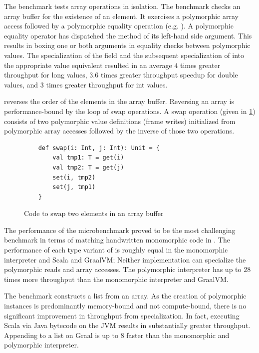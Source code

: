The  benchmark tests array operations in isolation. 
The benchmark checks an array buffer for the existence of an element.
It exercises a polymorphic array access followed by a polymorphic equality operation (e.g. ).
A polymorphic equality operator has dispatched the  method of its left-hand side argument.
This results in boxing one or both arguments in equality checks between polymorphic values.
The specialization of the  field and the subsequent specialization of  into the appropriate value equivalent resulted in an average $4$ times greater throughput for long values, $3.6$ times greater throughput  speedup for double values, and $3$ times greater throughput for int values.

 reverses the order of the elements in the array buffer.
Reversing an array is performance-bound by the loop of swap operations.
A swap operation (given in \ref{impl:swap}) consists of two polymorphic value definitions (frame writes) initialized from polymorphic array accesses followed by the inverse of those two operations.

\begin{figure}[!htb]
\begin{verbatim}
	def swap(i: Int, j: Int): Unit = {
		val tmp1: T = get(i)
		val tmp2: T = get(j)
		set(i, tmp2)
		set(j, tmp1)
	}
\end{verbatim}
\caption{Code to swap two elements in an array buffer}
\label{impl:swap}
\end{figure}

The performance of the  microbenchmark proved to be the most challenging benchmark in terms of matching handwritten monomorphic code in \cite{scala:miniboxing}.
The performance of each type variant of  is roughly equal in the monomorphic interpreter and Scala and GraalVM; 
Neither implementation can specialize the polymorphic reads and array accesses.
The polymorphic interpreter has up to $28$ times more throughput than the monomorphic interpreter and GraalVM.

The  benchmark constructs a list from an array.
As the creation of polymorphic instances is predominantly memory-bound and not compute-bound, there is no significant improvement in throughput from specialization.
In fact, executing Scala via Java bytecode on the JVM results in substantially greater throughput.
Appending to a list on Graal is up to $8$ faster than the monomorphic and polymorphic interpreter.

